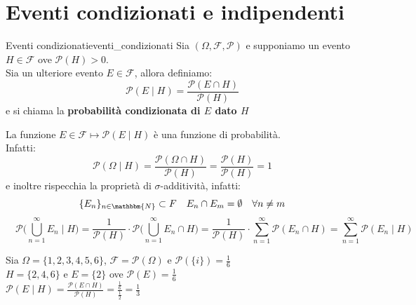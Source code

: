 \documentclass[12pt]{report}
\newcounter{definition}
\newcommand{\nmu}{}
\begin{document}
	\chapter{Eventi condizionati e indipendenti}
	\begin{definition}{\nmu Eventi condizionati}{eventi_condizionati}
		Sia $(\Omega, \mathcal{F}, \mathcal{P})$ e supponiamo un evento $H \in \mathcal{F}$ ove $\mathcal{P}(H) > 0$. \\
		Sia un ulteriore evento $E \in \mathcal{F}$, allora definiamo:
		\[
		\mathcal{P}(E \mid H) = \frac{\mathcal{P}(E \cap H)}{\mathcal{P}(H)}
		\]
		e si chiama la \textbf{probabilità condizionata di $E$ dato $H$}
	\end{definition}
	\begin{note}{}{}
		La funzione $E \in \mathcal{F} \mapsto \mathcal{P}(E \mid H)$ è una funzione di probabilità. \\
		Infatti:
		\[
		\mathcal{P}(\Omega \mid H) = \frac{\mathcal{P}(\Omega \cap H)}{\mathcal{P}(H)} = \frac{\mathcal{P}(H)}{\mathcal{P}(H)} = 1
		\]
		e inoltre rispecchia la proprietà di $\sigma$-additività, infatti:
		\[
		\{E_n\}_{n \in \mathbbm{N}} \subset F \quad E_n \cap E_m = \emptyset \quad \forall n \neq m
		\]
		\[
		\quad \mathcal{P}\Bigg(\bigcup_{n=1}^{\infty}E_n \mid H\Bigg) = \frac{1}{\mathcal{P}(H) } \cdot \mathcal{P}\Bigg(\bigcup_{n=1}^{\infty}E_n \cap H\Bigg) = \frac{1}{\mathcal{P}(H) } \cdot \sum_{n=1}^{\infty}\mathcal{P}(E_n \cap H) = \sum_{n=1}^{\infty}\mathcal{P}(E_n \mid H)
		\]

	\end{note}
	\begin{example}{}{}
		Sia $\Omega = \{1, 2, 3, 4, 5, 6\}$, $\mathcal{F} = \mathcal{P}(\Omega)$ e $\mathcal{P}(\{i\}) = \frac{1}{6}$ \\
		$H = \{2, 4, 6\}$ e $E = \{2\}$ ove $\mathcal{P}(E) = \frac{1}{6}$ \\
		$\mathcal{P}(E \mid H) = \frac{\mathcal{P}(E \cap H)}{\mathcal{P}(H)} = \frac{\frac{1}{6}}{\frac{1}{2}} = \frac{1}{3}$
	\end{example}
\end{document}
